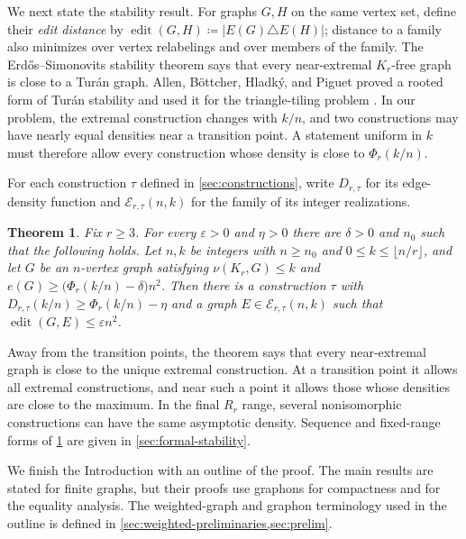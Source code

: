 \documentclass[10pt]{article}
\numberwithin{equation}{section}
\newtheorem{theorem}{Theorem}[section]
\newcommand{\edit}{\operatorname{edit}}
\newcommand{\cE}{\mathcal E}
\newcommand{\eps}{\varepsilon}
\begin{document}
We next state the stability result.  For graphs $G,H$ on the same vertex set, define their \emph{edit distance} by $\edit(G,H)\coloneqq|E(G)\triangle E(H)|$; distance to a family also minimizes over vertex relabelings and over members of the family.  The Erd\H{o}s--Simonovits stability theorem \cite{Erdos67,Simonovits68} says that every near-extremal $K_r$-free graph is close to a Tur\'an graph.  Allen, B\"ottcher, Hladk\'y, and Piguet \cite{ABHP14} proved a rooted form of Tur\'an stability and used it for the triangle-tiling problem \cite{ABHP15}.  In our problem, the extremal construction changes with $k/n$, and two constructions may have nearly equal densities near a transition point.  A statement uniform in $k$ must therefore allow every construction whose density is close to $\Phi_r(k/n)$.

For each construction $\tau$ defined in \cref{sec:constructions}, write $D_{r,\tau}$ for its edge-density function and $\cE_{r,\tau}(n,k)$ for the family of its integer realizations.

\begin{theorem}\label{thm:finite-stability}
Fix $r\ge3$.  For every $\eps>0$ and $\eta>0$ there are $\delta>0$ and $n_0$ such that the following holds.  Let $n,k$ be integers with $n\ge n_0$ and $0\le k\le\lfloor n/r\rfloor$, and let $G$ be an $n$-vertex graph satisfying $\nu(K_r,G)\le k$ and $e(G)\ge\bigl(\Phi_r(k/n)-\delta\bigr)n^2$.
Then there is a construction $\tau$ with $D_{r,\tau}(k/n)\ge \Phi_r(k/n)-\eta$ and a graph $E\in\cE_{r,\tau}(n,k)$ such that $\edit(G,E)\le\eps n^2$.
\end{theorem}

Away from the transition points, the theorem says that every near-extremal graph is close to the unique extremal construction.  At a transition point it allows all extremal constructions, and near such a point it allows those whose densities are close to the maximum.  In the final $R_r$ range, several nonisomorphic constructions can have the same asymptotic density.  Sequence and fixed-range forms of \cref{thm:finite-stability} are given in \cref{sec:formal-stability}.

We finish the Introduction with an outline of the proof.  The main results are stated for finite graphs, but their proofs use graphons for compactness and for the equality analysis.  The weighted-graph and graphon terminology used in the outline is defined in \cref{sec:weighted-preliminaries,sec:prelim}.
\end{document}

